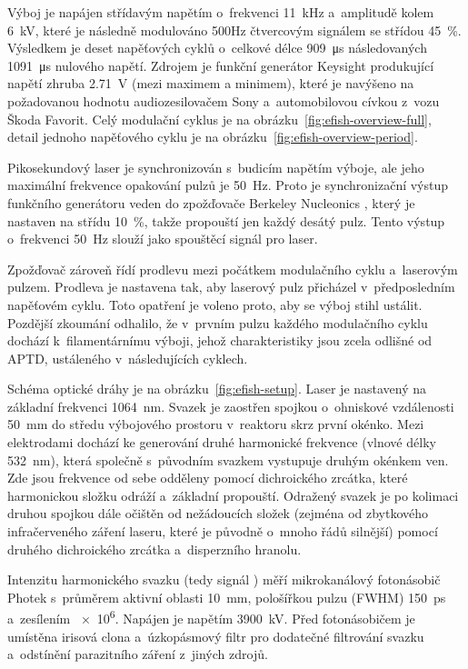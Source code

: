 Výboj je napájen střídavým napětím o~frekvenci \SI{11}{\kilo\hertz}
a~amplitudě kolem \SI{6}{\kilo\volt},
které je následně modulováno \num{500}\si{\hertz} čtvercovým signálem
se střídou \SI{45}{\percent}.
Výsledkem je deset napěťových cyklů o~celkové délce \SI{909}{\micro\second}
následovaných \SI{1091}{\micro\second} nulového napětí.
\autocite{efish-nitrogen}
Zdrojem je funkční generátor Keysight 
produkující napětí zhruba \SI{2.71}{\volt} (mezi maximem a minimem),
které je navýšeno na požadovanou hodnotu audiozesilovačem
Sony  a~automobilovou cívkou z~vozu Škoda Favorit.
Celý modulační cyklus je na obrázku~\ref{fig:efish-overview-full},
detail jednoho napěťového cyklu je na obrázku~\ref{fig:efish-overview-period}.

Pikosekundový laser je synchronizován s~budicím napětím výboje,
ale jeho maximální frekvence opakování pulzů je \SI{50}{\hertz}.
Proto je synchronizační výstup funkčního generátoru veden do zpožďovače
Berkeley Nucleonics ,
který je nastaven na střídu \SI{10}{\percent},
takže propouští jen každý desátý pulz.
Tento výstup o~frekvenci \SI{50}{\hertz} slouží jako spouštěcí signál
pro laser.

Zpožďovač zároveň řídí prodlevu mezi počátkem modulačního cyklu
a~laserovým pulzem.
Prodleva je nastavena tak, aby laserový pulz přicházel v~předposledním
napěťovém cyklu.
Toto opatření je voleno proto, aby se výboj stihl ustálit.
Pozdější zkoumání odhalilo, že v~prvním pulzu každého modulačního cyklu
dochází k~filamentárnímu výboji, jehož charakteristiky jsou zcela odlišné
od APTD, ustáleného v~následujících cyklech.

Schéma optické dráhy je na obrázku~\ref{fig:efish-setup}.
Laser je nastavený na základní frekvenci \SI{1064}{\nano\metre}.
Svazek je zaostřen spojkou o~ohniskové vzdálenosti \SI{50}{\milli\metre}
do středu výbojového prostoru v~reaktoru skrz první okénko.
Mezi elektrodami dochází ke generování druhé harmonické frekvence
(vlnové délky \SI{532}{\nano\metre}), která společně s~původním svazkem
vystupuje druhým okénkem ven.
Zde jsou frekvence od sebe odděleny pomocí dichroického zrcátka,
které harmonickou složku odráží a~základní propouští.
Odražený svazek je po kolimaci druhou spojkou dále očištěn od nežádoucích
složek (zejména od zbytkového infračerveného záření laseru,
které je původně o~mnoho řádů silnější)
pomocí druhého dichroického zrcátka a~disperzního hranolu.

Intenzitu harmonického svazku (tedy signál \EFISH{})
měří mikrokanálový fotonásobič
Photek  s~průměrem aktivní oblasti \SI{10}{\milli\metre},
pološířkou pulzu (FWHM) \SI{150}{\pico\second} a~zesílením \num{e6}.
Napájen je napětím \SI{3900}{\kilo\volt}.
Před fotonásobičem je umístěna irisová clona a~úzkopásmový filtr
pro dodatečné filtrování svazku a~odstínění parazitního záření
z~jiných zdrojů.

